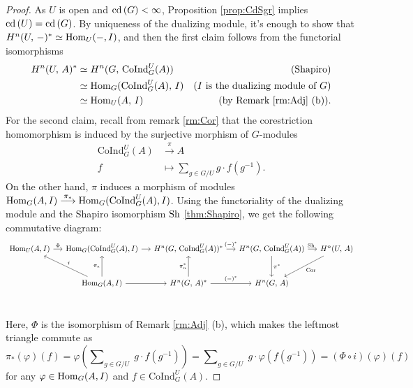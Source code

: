 \documentclass[a4paper, oneside]{memoir}
\begin{document}
\begin{proof}
	As \(U\) is open and \(\operatorname{cd}{(G)}<\infty\), Proposition \ref{prop:CdSgr} implies \(\operatorname{cd}{(U)}=\operatorname{cd}{(G)}\). By uniqueness of the dualizing module, it's enough to show that
	\(H^{n}( U, \, - )^*\simeq\operatorname{Hom}_U(-,I)\), and then the first claim follows from the functorial isomorphisms
	\begin{align*}
		H^{n}( U, \, A )^* & \simeq H^{n}( G, \, \mathrm{CoInd}_G^U(A) )   & \text{(Shapiro)}                            \\
		              & \simeq \operatorname{Hom}_G(\mathrm{CoInd}_G^U(A),\,I) & \text{($I$ is the dualizing module of $G$)} \\
		              & \simeq \operatorname{Hom}_U(A,\,I)                     & \text{(by Remark \eqref{rm:Adj} (b))}.
	\end{align*}
	For the second claim, recall from remark \ref{rm:Cor} that the corestriction homomorphism is induced by the surjective morphism of \(G\)-modules
	\begin{align*}
		\mathrm{CoInd}_G^U(A) & \overset{\pi}{\longrightarrow} A               \\
		f                     & \longmapsto \sum_{g\in G/U}{g\cdot f(g^{-1})}.
	\end{align*}
	On the other hand, $\pi$ induces a morphism of modules \(\operatorname{Hom}_G(A,I)\overset{\pi_*}{\longrightarrow}\operatorname{Hom}_G(\mathrm{CoInd}_G^U(A),I)\).
	Using the functoriality of the dualizing module and the Shapiro isomorphism $\operatorname{Sh}$ \eqref{thm:Shapiro},
	we get the following commutative diagram:
	\[
		\begin{tikzcd}[column sep=small, row sep=large]
			\Hom_U(A,I)
			\rar["\Phi"] &
			\Hom_G(\mathrm{CoInd}_G^U(A), I)
			\rar &
			\H{n}{G}{\mathrm{CoInd}_G^U(A)}^*
			\rar["(-)^*"]&\H{n}{G}{\mathrm{CoInd}_G^U(A)}
			\rar["\sh\ "]
			\ar[d, "\pi^*"]&\H{n}{U}{A}\ar[dl, "\Cor"] \\
			&
			\Hom_G(A,I) \ar[swap, lu, "i"]
			\ar[u, "\pi_*"]
			\rar &
			\H{n}{G}{A}^*
			\ar[u,"\pi_n^*"]
			\rar["(-)^*"] &
			\H{n}{G}{A} \\
		\end{tikzcd}
	\]
	Here, $\Phi$ is the isomorphism of Remark \ref{rm:Adj} (b),
	which makes the leftmost triangle commute as
	\[
		\pi_*(\varphi)(f) = \varphi\left(\sum\nolimits_{g\in G/U}\;{g\cdot f(g^{-1} )}\right) = \sum\nolimits_{g\in G/U}\;{g\cdot \varphi(f(g^{-1}))} = (\Phi\circ i) (\varphi)(f)
	\]
	for any \(\varphi\in\operatorname{Hom}_G(A,I)\) and \(f\in\mathrm{CoInd}_G^U(A)\).
\end{proof}
\end{document}
